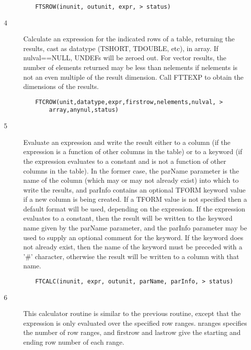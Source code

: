 \documentclass[11pt]{book}
\begin{document}
\begin{verbatim}
         FTSROW(inunit, outunit, expr, > status)
\end{verbatim}

\begin{description}
\item[4 ] Calculate an expression for the indicated rows of a table, returning
the results, cast as datatype (TSHORT, TDOUBLE, etc), in array.  If
nulval==NULL, UNDEFs will be zeroed out.  For vector results, the number
of elements returned may be less than nelements if nelements is not an
even multiple of the result dimension.  Call FTTEXP to obtain
the dimensions of the results.
\end{description}

\begin{verbatim}
         FTCROW(unit,datatype,expr,firstrow,nelements,nulval, >
             array,anynul,status)
\end{verbatim}

\begin{description}
\item[5 ]Evaluate an expression and write the result either to a column (if
the expression is a function of other columns in the table) or to a
keyword (if the expression evaluates to a constant and is not a
function of other columns in the table).  In the former case, the
parName parameter is the name of the column (which may or may not already
exist) into which to write the results, and parInfo contains an
optional TFORM keyword value if a new column is being created.  If a
TFORM value is not specified then a default format will be used,
depending on the expression.  If the expression evaluates to a constant,
then the result will be written to the keyword name given by the
parName parameter, and the parInfo parameter may be used to supply an
optional comment for the keyword.  If the keyword does not already
exist, then the name of the keyword must be preceded with a '\#' character,
otherwise the result will be written to a column with that name.
\end{description}


\begin{verbatim}
         FTCALC(inunit, expr, outunit, parName, parInfo, > status)
\end{verbatim}

\begin{description}
\item[6 ] This calculator routine is similar to the previous routine, except
that the expression is only evaluated over the specified
row ranges.  nranges specifies the number of row ranges, and firstrow
and lastrow give the starting and ending row number of each range.
\end{description}
\end{document}
